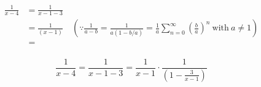 \documentclass[11pt,openany]{article}
\begin{document}
\begin{align*}
	\frac{1}{x-4}&=\frac{1}{x-1-3}\\
	&=\frac{1}{(x-1)}\quad(\because \frac{1}{a-b}=\frac{1}{a(1-b/a)}=\frac{1}{a}\sum_{n=0}^{\infty}\left(\frac{b}{a}\right)^n\ \text{with}\ a\neq 1)\\
	&=\frac{}{}
\end{align*}

\[
\frac{1}{x-4}=\frac{1}{x-1-3}=\frac{1}{x-1}\cdot\frac{1}{(1-\frac{3}{x-1})}
\]

	
\end{document}
